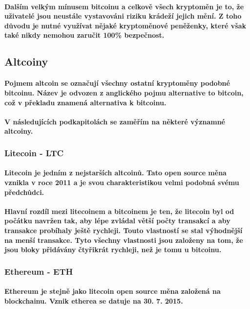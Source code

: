 \documentclass[thesis=B,czech]{FITthesis}[2019/03/21]
\begin{document}
\paragraph{
Dalším velkým mínusem bitcoinu a celkově všech kryptoměn je to, že uživatelé jsou neustále vystavováni riziku krádeží jejich mění. Z toho důvodu je nutné využívat nějaké kryptoměnové peněženky, které však také nikdy nemohou zaručit 100\% bezpečnost.\cite{Finex}
}
\subsection{Altcoiny}
\paragraph{
Pojmem altcoin se označují všechny ostatní kryptoměny podobné bitcoinu. Název je odvozen z anglického pojmu alternative to bitcoin, což v překladu znamená alternativa k bitcoinu. \cite{altcoin}
}
\paragraph{
V následujících podkapitolách se zaměřím na některé významné altcoiny.
}
\subsubsection{Litecoin - LTC}
\paragraph{
Litecoin je jedním z nejstarších altcoinů. Tato open source měna vznikla v roce 2011 a je svou charakteristikou velmi podobná svému předchůdci. 
}
\paragraph{
Hlavní rozdíl mezi litecoinem a bitcoinem je ten, že litecoin byl od počátku navržen tak, aby lépe zvládal větší počty transakcí a aby transakce probíhaly ještě rychleji. Touto vlastností se stal výhodnější na menší transakce. Tyto všechny vlastnosti jsou založeny na tom, že jsou bloky přidávány čtyřikrát rychleji, než je tomu u bitcoinu. \cite{litecoin}
}
\subsubsection{Ethereum - ETH}
\paragraph{
Ethereum je stejně jako litecoin open source měna založená na blockchainu. Vznik etherea se datuje na 30. 7. 2015. 
}
\end{document}
